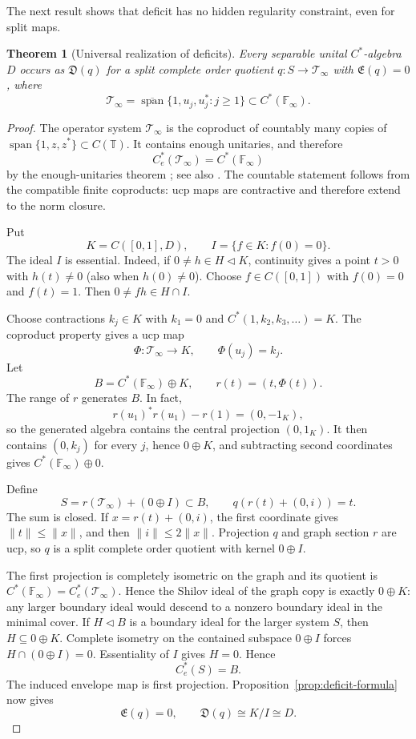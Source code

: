 \documentclass[11pt,a4paper]{amsart}
\theoremstyle{plain}
\newtheorem{theorem}{Theorem}[section]
\theoremstyle{definition}
\newcommand{\Ce}{C_e^*}
\newcommand{\Esc}{\mathfrak E}
\newcommand{\Def}{\mathfrak D}
\begin{document}
The next result shows that deficit has no hidden regularity constraint, even for split maps.

\begin{theorem}[Universal realization of deficits]\label{thm:universal-deficit}
Every separable unital $C^*$-algebra $D$ occurs as $\Def(q)$ for a split complete order quotient
$q:S\to\mathcal T_\infty$ with $\Esc(q)=0$, where
\[
 \mathcal T_\infty=\overline{\operatorname{span}}
 \{1,u_j,u_j^*:j\geq1\}\subset C^*(\mathbb F_\infty).
\]
\end{theorem}

\begin{proof}
The operator system $\mathcal T_\infty$ is the coproduct of countably many copies of
$\operatorname{span}\{1,z,z^*\}\subset C(\mathbb T)$.  It contains enough unitaries, and therefore
\begin{equation}\label{eq:Tinfty-envelope}
 \Ce(\mathcal T_\infty)=C^*(\mathbb F_\infty)
\end{equation}
by the enough-unitaries theorem \cite[Proposition~5.6]{Kavruk2014}; see also
\cite{FarenickEtAl2014}.  The countable statement follows from the compatible finite coproducts:
ucp maps are contractive and therefore extend to the norm closure.

Put
\[
 K=C([0,1],D),\qquad I=\{f\in K:f(0)=0\}.
\]
The ideal $I$ is essential.  Indeed, if $0\ne h\in H\triangleleft K$, continuity gives a point
$t>0$ with $h(t)\ne0$ (also when $h(0)\ne0$).  Choose $f\in C([0,1])$ with $f(0)=0$ and
$f(t)=1$.  Then $0\ne fh\in H\cap I$.

Choose contractions $k_j\in K$ with $k_1=0$ and
$C^*(1,k_2,k_3,\ldots)=K$.  The coproduct property gives a ucp map
\[
 \Phi:\mathcal T_\infty\to K,\qquad \Phi(u_j)=k_j.
\]
Let
\[
 B=C^*(\mathbb F_\infty)\oplus K,\qquad r(t)=(t,\Phi(t)).
\]
The range of $r$ generates $B$.  In fact,
\[
 r(u_1)^*r(u_1)-r(1)=(0,-1_K),
\]
so the generated algebra contains the central projection $(0,1_K)$.  It then contains
$(0,k_j)$ for every $j$, hence $0\oplus K$, and subtracting second coordinates gives
$C^*(\mathbb F_\infty)\oplus0$.

Define
\[
 S=r(\mathcal T_\infty)+(0\oplus I)\subset B,
 \qquad q(r(t)+(0,i))=t.
\]
The sum is closed.  If $x=r(t)+(0,i)$, the first coordinate gives
$\|t\|\leq\|x\|$, and then $\|i\|\leq2\|x\|$.  Projection $q$ and graph section $r$ are ucp, so
$q$ is a split complete order quotient with kernel $0\oplus I$.

The first projection is completely isometric on the graph and its quotient is
$C^*(\mathbb F_\infty)=\Ce(\mathcal T_\infty)$.  Hence the Shilov ideal of the graph copy is
exactly $0\oplus K$: any larger boundary ideal would descend to a nonzero boundary ideal in the
minimal cover.  If $H\triangleleft B$ is a boundary ideal for the larger system $S$, then
$H\subseteq0\oplus K$.  Complete isometry on the contained subspace $0\oplus I$ forces
$H\cap(0\oplus I)=0$.  Essentiality of $I$ gives $H=0$.  Hence
\[
 \Ce(S)=B.
\]
The induced envelope map is first projection.  Proposition~\ref{prop:deficit-formula} now gives
\[
 \Esc(q)=0,\qquad
 \Def(q)\cong K/I\cong D.
\]
\end{proof}
\end{document}
